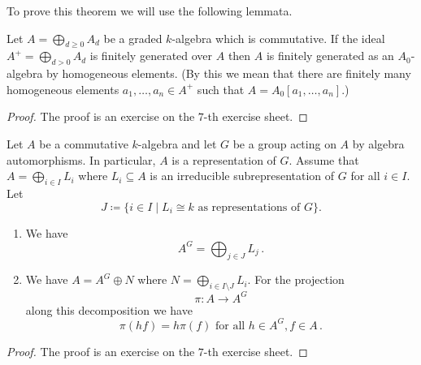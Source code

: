 To prove this theorem we will use the following lemmata.


\begin{lem}\label{lem: technical lemma about generating}
  Let $A = \bigoplus_{d \geq 0} A_d$ be a graded $k$-algebra which is commutative.
  If the ideal $A^+ = \bigoplus_{d > 0} A_d$ is finitely generated over $A$ then $A$ is finitely generated as an $A_0$-algebra by homogeneous elements.
  (By this we mean that there are finitely many homogeneous elements $a_1, \dotsc, a_n \in A^+$ such that $A = A_0[a_1, \dotsc, a_n]$.)
\end{lem}
\begin{proof}
  The proof is an exercise on the $7$-th exercise sheet.
\end{proof}


\begin{lem}\label{lem: projection reynold operator}
  Let $A$ be a commutative $k$-algebra and let $G$ be a group acting on $A$ by algebra automorphisms.
  In particular, $A$ is a representation of $G$.
  Assume that $A = \bigoplus_{i \in I} L_i$ where $L_i \subseteq A$ is an irreducible subrepresentation of $G$ for all $i \in I$.
  Let
  \[
              J
    \coloneqq \{
                i \in I
              \mid
                      L_i
                \cong k
                \text{ as representations of $G$}
              \}.
  \]
  \begin{enumerate}[label=\emph{\alph*)},leftmargin=*]
    \item
      We have
      \[
          A^G
        = \bigoplus_{j \in J} L_j \,.
      \]
    \item
      We have $A = A^G \oplus N$ where $N = \bigoplus_{i \in I \setminus J} L_i$. For the projection
      \[
                \pi
        \colon  A
        \to     A^G
      \]
      along this decomposition we have
      \[
          \pi(hf)
        = h\pi(f)
        \text{ for all }
        h \in A^G,
        f \in A \,.
      \]
  \end{enumerate}
\end{lem}
\begin{proof}
  The proof is an exercise on the $7$-th exercise sheet.
\end{proof}


